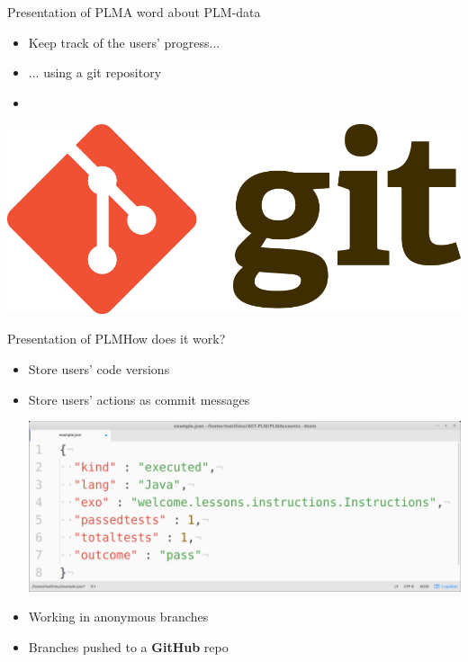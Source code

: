 \documentclass{beamer}
\begin{document}
\begin{frame}{Presentation of PLM}{A word about PLM-data}
  \begin{itemize}
  \item { 
    Keep track of the users' progress...
    \pause
  }
  \item ... using a git repository
  \item[~]
  \end{itemize}
  \begin{center}
    \includegraphics[scale=0.1]{img/git.png}
  \end{center}
\end{frame}

\begin{frame}{Presentation of PLM}{How does it work?}
  \begin{itemize}
  \item { 
    Store users' code versions
    \pause
  }
  \item {
    Store users' actions as commit messages
    \begin{center}
      \includegraphics[scale=0.2]{img/commit.png}
    \end{center}
    \pause
  }
  \item {
    Working in anonymous branches
  }
  \item {
    Branches pushed to a \textbf{GitHub} repo
  }
  \end{itemize}
\end{frame}
\end{document}
